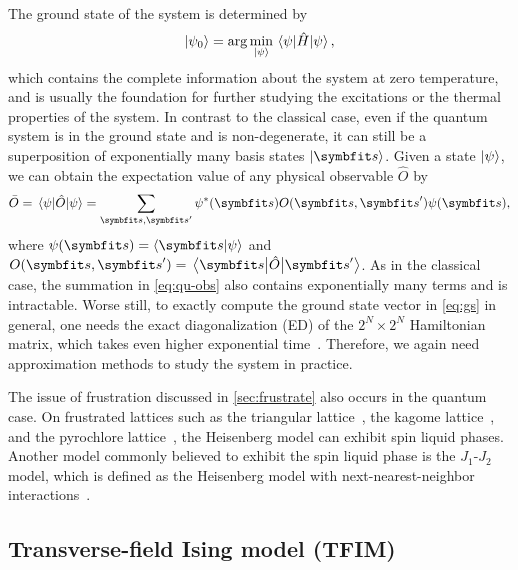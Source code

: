 The ground state of the system is determined by
\begin{equation}
\ket{\psi_0} = \arg\min_{\ket{\psi}} \ev{\hat{H}}{\psi},
\label{eq:gs}
\end{equation}
which contains the complete information about the system at zero temperature, and is usually the foundation for further studying the excitations or the thermal properties of the system. In contrast to the classical case, even if the quantum system is in the ground state and is non-degenerate, it can still be a superposition of exponentially many basis states $\ket{\vs}$. Given a state $\ket{\psi}$, we can obtain the expectation value of any physical observable $\hat{O}$ by
\begin{equation}
\bar{O} = \ev{\hat{O}}{\psi} = \sum_{\vs, \vs'} \psi^*(\vs) O(\vs, \vs') \psi(\vs),
\label{eq:qu-obs}
\end{equation}
where $\psi(\vs) = \ip{\vs}{\psi}$ and $O(\vs, \vs') = \mel{\vs}{\hat{O}}{\vs'}$. As in the classical case, the summation in \cref{eq:qu-obs} also contains exponentially many terms and is intractable. Worse still, to exactly compute the ground state vector in \cref{eq:gs} in general, one needs the exact diagonalization (ED) of the $2^N \times 2^N$ Hamiltonian matrix, which takes even higher exponential time~\cite{weisse2008exact}. Therefore, we again need approximation methods to study the system in practice.

The issue of frustration discussed in \cref{sec:frustrate} also occurs in the quantum case. On frustrated lattices such as the triangular lattice~\cite{li2015rare}, the kagome lattice~\cite{norman2016colloquium}, and the pyrochlore lattice~\cite{moessner1998properties}, the Heisenberg model can exhibit spin liquid phases. Another model commonly believed to exhibit the spin liquid phase is the $J_1$-$J_2$ model, which is defined as the Heisenberg model with next-nearest-neighbor interactions~\cite{dagotto1989phase, schulz1996magnetic, hu2013direct, liu2018gapless}.


\subsection{Transverse-field Ising model (TFIM)}
\label{sec:qu-ising}

